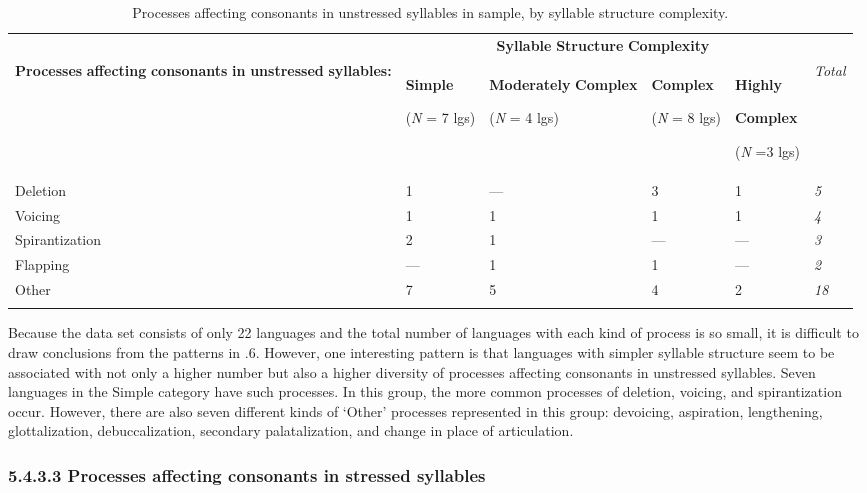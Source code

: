 \begin{table}
\begin{tabularx}{\textwidth}{XXXXXX}
\lsptoprule
 & \multicolumn{4}{c}{ \textbf{Syllable} \textbf{Structure} \textbf{Complexity}} & \\
 \textbf{Processes} \textbf{affecting} \textbf{consonants} \textbf{in} \textbf{unstressed} \textbf{syllables:} & { \textbf{Simple}}

 (\textit{N} = 7 lgs) & { \textbf{Moderately} \textbf{Complex}}

 (\textit{N} = 4 lgs) & { \textbf{Complex}}

 (\textit{N} = 8 lgs) & { \textbf{Highly} }

{ \textbf{Complex}}

 (\textit{N} =3 lgs) & \textit{Total}\\
 Deletion & 1 & — & 3 & 1 & \textit{5}\\
 Voicing & 1 & 1 & 1 & 1 & \textit{4}\\
 Spirantization & 2 & 1 & — & — & \textit{3}\\
 Flapping & — & 1 & 1 & — & \textit{2}\\
 Other & 7 & 5 & 4 & 2 & \textit{18}\\
\lspbottomrule
\end{tabularx}
\caption{\label{5.6}Processes affecting consonants in unstressed syllables in sample, by syllable structure complexity.}
\end{table}




  Because the data set consists of only 22 languages and the total number of languages with each kind of process is so small, it is difficult to draw conclusions from the patterns in .6. However, one interesting pattern is that languages with simpler syllable structure seem to be associated with not only a higher number but also a higher diversity of processes affecting consonants in unstressed syllables. Seven languages in the Simple category have such processes. In this group, the more common processes of deletion, voicing, and spirantization occur. However, there are also seven different kinds of ‘Other’ processes represented in this group: devoicing, aspiration, lengthening, glottalization, debuccalization, secondary palatalization, and change in place of articulation.


\subsubsection{\textbf{5.4.3.3} \textbf{Processes} \textbf{affecting} \textbf{consonants} \textbf{in} \textbf{stressed} \textbf{syllables}}

